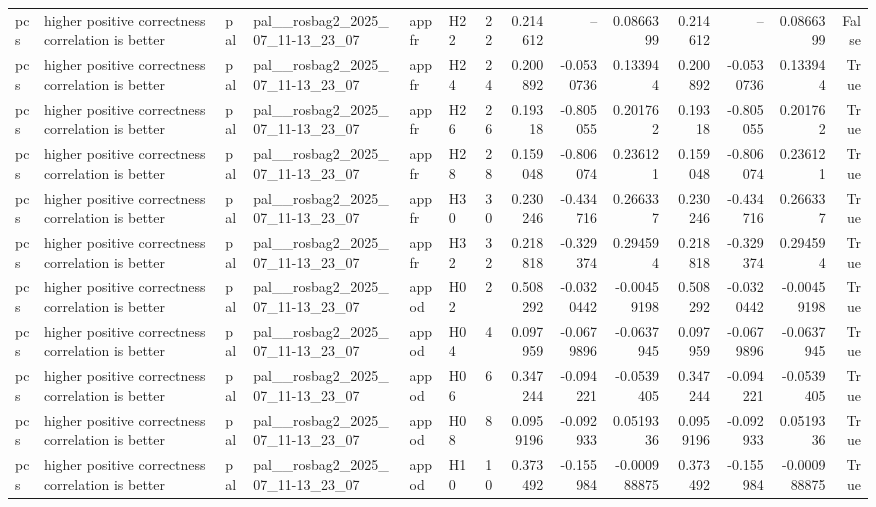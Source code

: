 \begin{longtable}{llllllrrrrrrrr}
pcs & higher positive correctness correlation is better & pal & pal\_\_rosbag2\_2025\_07\_11-13\_23\_07 & appfr & H22 & 22 & 0.214612 & -- & 0.0866399 & 0.214612 & -- & 0.0866399 & False \\
pcs & higher positive correctness correlation is better & pal & pal\_\_rosbag2\_2025\_07\_11-13\_23\_07 & appfr & H24 & 24 & 0.200892 & -0.0530736 & 0.133944 & 0.200892 & -0.0530736 & 0.133944 & True \\
pcs & higher positive correctness correlation is better & pal & pal\_\_rosbag2\_2025\_07\_11-13\_23\_07 & appfr & H26 & 26 & 0.19318 & -0.805055 & 0.201762 & 0.19318 & -0.805055 & 0.201762 & True \\
pcs & higher positive correctness correlation is better & pal & pal\_\_rosbag2\_2025\_07\_11-13\_23\_07 & appfr & H28 & 28 & 0.159048 & -0.806074 & 0.236121 & 0.159048 & -0.806074 & 0.236121 & True \\
pcs & higher positive correctness correlation is better & pal & pal\_\_rosbag2\_2025\_07\_11-13\_23\_07 & appfr & H30 & 30 & 0.230246 & -0.434716 & 0.266337 & 0.230246 & -0.434716 & 0.266337 & True \\
pcs & higher positive correctness correlation is better & pal & pal\_\_rosbag2\_2025\_07\_11-13\_23\_07 & appfr & H32 & 32 & 0.218818 & -0.329374 & 0.294594 & 0.218818 & -0.329374 & 0.294594 & True \\
pcs & higher positive correctness correlation is better & pal & pal\_\_rosbag2\_2025\_07\_11-13\_23\_07 & appod & H02 & 2 & 0.508292 & -0.0320442 & -0.00459198 & 0.508292 & -0.0320442 & -0.00459198 & True \\
pcs & higher positive correctness correlation is better & pal & pal\_\_rosbag2\_2025\_07\_11-13\_23\_07 & appod & H04 & 4 & 0.097959 & -0.0679896 & -0.0637945 & 0.097959 & -0.0679896 & -0.0637945 & True \\
pcs & higher positive correctness correlation is better & pal & pal\_\_rosbag2\_2025\_07\_11-13\_23\_07 & appod & H06 & 6 & 0.347244 & -0.094221 & -0.0539405 & 0.347244 & -0.094221 & -0.0539405 & True \\
pcs & higher positive correctness correlation is better & pal & pal\_\_rosbag2\_2025\_07\_11-13\_23\_07 & appod & H08 & 8 & 0.0959196 & -0.092933 & 0.0519336 & 0.0959196 & -0.092933 & 0.0519336 & True \\
pcs & higher positive correctness correlation is better & pal & pal\_\_rosbag2\_2025\_07\_11-13\_23\_07 & appod & H10 & 10 & 0.373492 & -0.155984 & -0.000988875 & 0.373492 & -0.155984 & -0.000988875 & True \\

\end{longtable}

